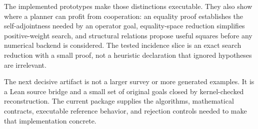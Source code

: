 The implemented prototypes make those distinctions executable. They also show
where a planner can profit from cooperation: an equality proof establishes the
self-adjointness needed by an operator goal, equality-space reduction simplifies
positive-weight search, and structural relations propose useful squares before
any numerical backend is considered. The tested incidence slice is an exact
search reduction with a small proof, not a heuristic declaration that ignored
hypotheses are irrelevant.

The next decisive artifact is not a larger survey or more generated examples.
It is a Lean source bridge and a small set of original goals closed by
kernel-checked reconstruction. The current package supplies the algorithms,
mathematical contracts, executable reference behavior, and rejection controls
needed to make that implementation concrete.
